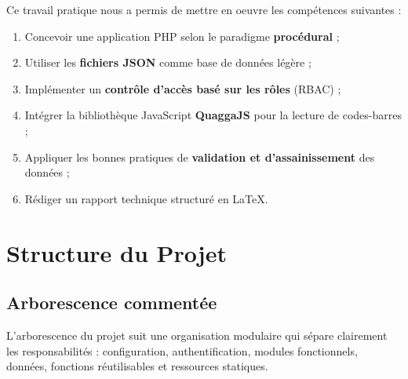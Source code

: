 \documentclass[12pt,a4paper]{report}
\begin{document}
Ce travail pratique nous a permis de mettre en oeuvre les compétences suivantes :
\begin{enumerate}
  \item Concevoir une application PHP selon le paradigme \textbf{procédural} ;
  \item Utiliser les \textbf{fichiers JSON} comme base de données légère ;
  \item Implémenter un \textbf{contrôle d'accès basé sur les rôles} (RBAC) ;
  \item Intégrer la bibliothèque JavaScript \textbf{QuaggaJS} pour la lecture de codes-barres ;
  \item Appliquer les bonnes pratiques de \textbf{validation et d'assainissement} des données ;
  \item Rédiger un rapport technique structuré en \LaTeX{}.
\end{enumerate}

\chapter{Structure du Projet}

\section{Arborescence commentée}

L'arborescence du projet suit une organisation modulaire qui sépare clairement les
responsabilités : configuration, authentification, modules fonctionnels, données,
fonctions réutilisables et ressources statiques.
\end{document}

